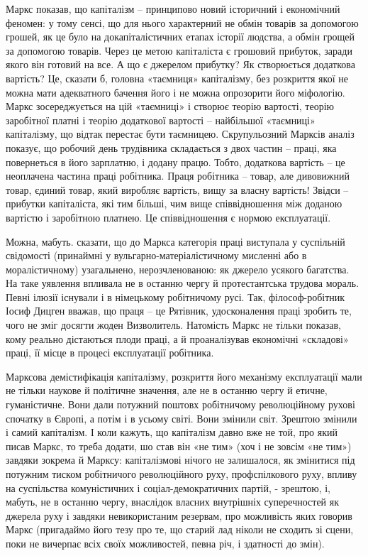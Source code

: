 \documentclass{kapital}
\begin{document}
      Маркс показав, що капіталізм – принципово новий історичний і економічний феномен: у тому сенсі, що для нього  характерний не обмін товарів за допомогою грошей, як це було на докапіталістичних етапах історії людства, а обмін грощей за допомогою товарів. Через це метою капіталіста є грошовий прибуток, заради якого він готовий на все. А що є джерелом  прибутку? Як створюється додаткова вартість?  Це, сказати б, головна «таємниця» капіталізму, без розкриття якої не можна мати адекватного бачення його і не можна опрозорити його міфологію. Маркс зосереджується на цій «таємниці» і створює теорію вартості, теорію заробітної платні і теорію додаткової вартості – найбільшої «таємниці» капіталізму, що відтак перестає бути таємницею. Скрупульозний Марксів аналіз показує, що робочий день трудівника складається з двох частин – праці, яка повернеться в його  зарплатню, і додану працю. Тобто, додаткова вартість – це неоплачена частина праці робітника. Праця робітника – товар, але дивовижний товар, єдиний товар,  який виробляє вартість, вищу за власну вартість! Звідси – прибутки капіталіста, які тим більші, чим вище співвідношення між доданою вартістю і заробітною платнею. Це співвідношення є нормою експлуатації.
 
	Можна, мабуть. сказати, що до Маркса категорія праці виступала у суспільній свідомості  (принаймні у вульгарно-матеріалістичному мисленні або в моралістичному)  узагальнено, нерозчленованою: як джерело усякого багатства. На таке уявлення впливала  не в останню чергу й протестантська трудова мораль. Певні ілюзії існували і в німецькому робітничому русі. Так, філософ-робітник Іосиф Дицген вважав, що праця – це Рятівник, удосконалення праці зробить те, чого не зміг досягти жоден Визволитель. Натомість Маркс не тільки показав, кому реально дістаються плоди праці, а й проаналізував економічні «складові»  праці, її місце в процесі експлуатації робітника.   
 
	Марксова демістифікація капіталізму, розкриття його механізму експлуатації мали не тільки наукове й політичне значення, але не в останню чергу й етичне, гуманістичне. Вони дали потужний поштовх робітничому революційному рухові спочатку в Європі, а потім і в усьому світі. Вони змінили світ. Зрештою змінили і самий капіталізм. І коли кажуть, що капіталізм давно вже не той, про який писав Маркс, то треба додати, шо став він «не тим» (хоч і не зовсім «не тим»)  завдяки зокрема й Марксу: капіталізмові нічого не залишалося, як змінитися під потужним тиском робітничого революційного руху, профспілкового руху, впливу на суспільства комуністичних і соціал-демократичних партій, - зрештою, і, мабуть, не в останню чергу, внаслідок власних внутрішніх суперечностей як джерела руху і завдяки невикористаним резервам, про можливість яких говорив Маркс (пригадаймо його тезу про те, що старий лад ніколи не сходить зі сцени, поки не вичерпає всіх своїх можливостей, певна річ, і здатності до змін).
 
\end{document}
